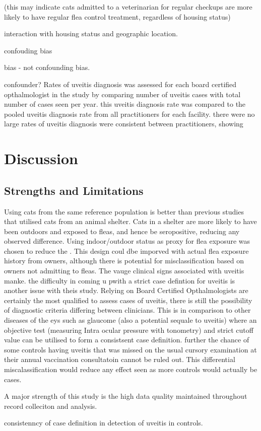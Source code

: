 \documentclass[11pt,twocolumn]{article}
\begin{document}
		(this may indicate cats admitted to a veterinarian for regular checkups are more likely to have regular flea control treatment, regardless of housing status)



		interaction with housing status and geographic location.
		
		confouding bias 

		bias - not confounding bias.


		confounder?
		Rates of uveitis diagnosis was assessed for each board certified opthalmologist in the study by comparing number of uveitis cases with total number of cases seen per year. this uveitis diagnosis rate was compared to the pooled uveitis diagnosis rate from all practitioners for each facility. 
		there were no large 
		rates of uveitis diagnosis were consistent between practitioners, showing 
		


		\newpage
\section{Discussion}
	\subsection{Strengths and Limitations}
		Using cats from the same reference population is better than previous studies that utilised cats from an animal shelter. Cats in a shelter are more likely to have been outdoors and exposed to fleas, and hence be seropositive, reducing any observed difference.
		Using indoor/outdoor status as proxy for flea exposure was chosen to reduce the . 
		This design coul dbe imporved with actual flea exposure history from owners, although there is potential for misclassification based on owners not admitting to fleas.
		The vauge clinical signs associated with uveitis manke.
		the difficulty in coming u pwith a strict case defintion for uveitis is another issue with theis study. Relying on Board Certified Opthalmologists are certainly the most qualified to assess cases of uveitis, there is still the possibility of diagnostic criteria differing between clinicians. This is in comparison to other diseases of the eys such as glaucome (also a potential sequale to uveitis) where an objective test (measuring Intra ocular pressure with tonometry) and strict cutoff value can be utilised to form a consistsent case definition.
		further the chance of some controls having uveitis that was missed on the usual cursory examination at their annual vaccination consultatoin cannot be ruled out. This differential miscalassification would reduce any effect seen as more controls would actually be cases.

		A major strength of this study is the high data quality maintained throughout record colleciton and analysis.

		consistenncy of case definition in 
		detection of uveitis in controls.
\newpage
\newpage


\end{document}
